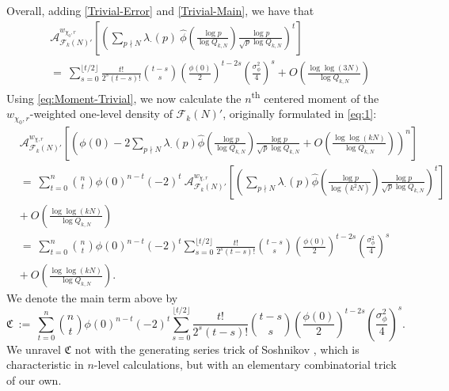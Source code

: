 \documentclass[12pt, reqno,oneside]{amsart}
\theoremstyle{plain}
\theoremstyle{definition}
\theoremstyle{remark}
\theoremstyle{plain}
\numberwithin{equation}{section}
\begin{document}
Overall, adding \eqref{Trivial-Error} and \eqref{Trivial-Main}, we have that 
\begin{align}
\nonumber
&\mathcal{A}^{w_{\chi_0,r}}_{\mathcal{F}_k(N)'}\left[\left(\sum\nolimits_{p\nmid N}\lambda_\cdot(p) \ \widehat{\phi}\left(\frac{\log p}{\log Q_{k,N}}\right)\frac{\log p}{\sqrt{p}\log Q_{k,N}}\right)^t\right] \\
\label{eq:Moment-Trivial}
&= \ \sum_{s=0}^{\lfloor t/2\rfloor}\frac{t!}{2^s(t-s)!}\binom{t-s}{s}\left(\frac{\phi(0)}{2}\right)^{t-2s}\left(\frac{\sigma_\phi^2}{4}\right)^{s}+O\left(\frac{\log\log(3N)}{\log Q_{k,N}}\right)
\end{align}
Using \eqref{eq:Moment-Trivial}, we now calculate the $n$\textsuperscript{th} centered moment of the $w_{\chi_0,r}$-weighted one-level density of $\mathcal{F}_{k}(N)'$, originally formulated in \eqref{eq:1}:
\begin{align}
\nonumber
&\mathcal{A}^{w_{\chi,r}}_{\mathcal{F}_k(N)'}\left[\left(\phi(0)-2\sum_{p\nmid N}\lambda_\cdot(p)\widehat{\phi}\left(\frac{\log p}{\log Q_{k,N}}\right)\frac{\log p}{\sqrt{p}\log Q_{k,N}}+O\left(\frac{\log\log(kN)}{\log Q_{k,N}}\right)\right)^n\right]\\
\nonumber
& = \ 
\sum_{t=0}^n\binom{n}{t}\phi(0)^{n-t}(-2)^t \ \mathcal{A}^{w_{\chi,r}}_{\mathcal{F}_k(N)'}\left[\left(\sum_{p\nmid N}\lambda_\cdot(p)\widehat{\phi}\left(\frac{\log p}{\log(k^2N)}\right)\frac{\log p}{\sqrt{p}\log Q_{k,N}}\right)^t\right] \\
\nonumber
& + \ O\left(\frac{\log\log(kN)}{\log Q_{k,N}}\right)\\
\nonumber
& = \ \sum_{t=0}^n\binom{n}{t}\phi(0)^{n-t}(-2)^t\sum_{s=0}^{\lfloor t/2\rfloor}\frac{t!}{2^s(t-s)!}\binom{t-s}{s}\left(\frac{\phi(0)}{2}\right)^{t-2s}\left(\frac{\sigma_\phi^2}{4}\right)^{s} \\
& + \ O\left(\frac{\log\log(kN)}{\log Q_{k,N}}\right).
\end{align}
We denote the main term above by
\begin{equation}
\mathfrak{C} \ := \ \sum_{t=0}^n\binom{n}{t}\phi(0)^{n-t}(-2)^t\sum_{s=0}^{\lfloor t/2\rfloor}\frac{t!}{2^s(t-s)!}\binom{t-s}{s}\left(\frac{\phi(0)}{2}\right)^{t-2s}\left(\frac{\sigma_\phi^2}{4}\right)^{s}.
\end{equation}
We unravel $\mathfrak{C}$ not with the generating series trick of Soshnikov \cite[Lemma 2]{Sos00}, which is characteristic in $n$-level calculations, but with an elementary combinatorial trick of our own.
\end{document}
